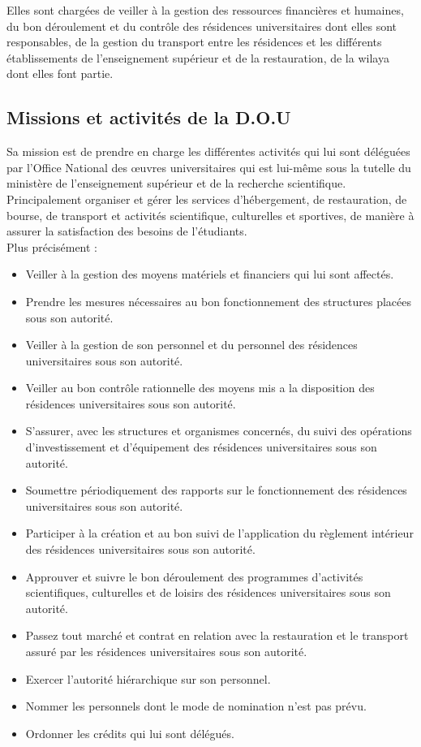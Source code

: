 Elles sont chargées de veiller à la gestion des ressources financières et humaines, du bon déroulement et du contrôle des résidences universitaires dont elles sont responsables, de la gestion du transport entre les résidences et les différents établissements de l'enseignement supérieur et de la restauration, de la wilaya dont elles font partie.\\

\subsection{Missions et activités de la \acs{D.O.U} \cite{onou-arrete}}
Sa mission est de prendre en charge les différentes activités qui lui sont déléguées par l'Office National des œuvres universitaires qui est lui-même sous la tutelle du ministère de l'enseignement supérieur et de la recherche scientifique.\\

Principalement organiser et gérer les services d'hébergement, de restauration, de bourse, de transport et activités scientifique, culturelles et sportives, de manière à assurer la satisfaction des besoins de l’étudiants.\\

Plus précisément :

\begin{itemize}\renewcommand{\labelitemi}{$\bullet$}
    \item Veiller à la gestion des moyens matériels et financiers qui lui sont affectés.
    \item Prendre les mesures nécessaires au bon fonctionnement des structures placées sous son autorité.
    \item Veiller à la gestion de son personnel et du personnel des résidences universitaires sous son autorité.
    \item Veiller au bon contrôle rationnelle des moyens mis a la disposition des résidences universitaires sous son autorité.
    \item S'assurer, avec les structures et organismes concernés, du suivi des opérations d'investissement et d'équipement des résidences universitaires sous son autorité.
    \item Soumettre périodiquement des rapports sur le fonctionnement des résidences universitaires sous son autorité.
    \item Participer à la création et au bon suivi de l'application du règlement intérieur des résidences universitaires sous son autorité.
    \item Approuver et suivre le bon déroulement des programmes d'activités scientifiques, culturelles et de loisirs des résidences universitaires sous son autorité.
    \item Passez tout marché et contrat en relation avec la restauration et le transport assuré par les résidences universitaires sous son autorité.
    \item Exercer l'autorité hiérarchique sur son personnel.
    \item Nommer les personnels dont le mode de nomination n'est pas prévu.
    \item Ordonner les crédits qui lui sont délégués.
\end{itemize}

